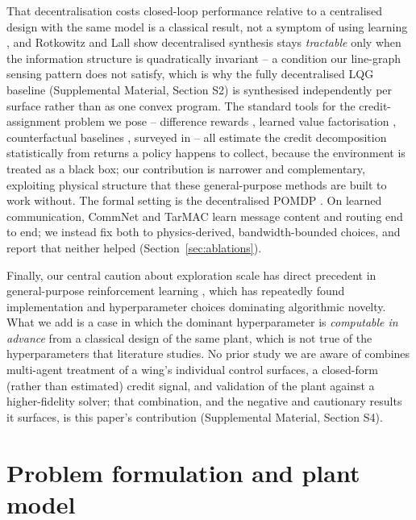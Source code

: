 \documentclass[journal]{new-aiaa}
\begin{document}
That decentralisation costs closed-loop performance relative to a
centralised design with the same model is a classical result, not a
symptom of using learning \cite{siljak1991decentralized,
bakule2008decentralized}, and Rotkowitz and Lall
\cite{rotkowitz2006characterization} show decentralised synthesis stays
\emph{tractable} only when the information structure is quadratically
invariant -- a condition our line-graph sensing pattern does not satisfy,
which is why the fully decentralised LQG baseline (Supplemental Material,
Section S2) is synthesised independently per surface rather than as one
convex program. The standard tools for the credit-assignment problem we
pose -- difference rewards \cite{wolpert2002difference}, learned value
factorisation \cite{sunehag2018vdn,rashid2018qmix}, counterfactual baselines
\cite{foerster2018coma}, surveyed in
\cite{albrecht2023survey,scalingmarl2025,multilevelcredit2025} -- all
estimate the credit decomposition statistically from returns a policy
happens to collect, because the environment is treated as a black box; our
contribution is narrower and complementary, exploiting physical structure
that these general-purpose methods are built to work without. The formal
setting is the decentralised POMDP
\cite{bernstein2002complexity,oliehoek2016concise}. On learned
communication, CommNet \cite{sukhbaatar2016commnet} and TarMAC
\cite{das2019tarmac} learn message content and routing end to end; we
instead fix both to physics-derived, bandwidth-bounded choices, and report
that neither helped (Section~\ref{sec:ablations}).

Finally, our central caution about exploration scale has direct precedent
in general-purpose reinforcement learning
\cite{henderson2018matters,engstrom2020implementation,andrychowicz2021what,
agarwal2021precipice,yu2022mappo}, which has repeatedly found
implementation and hyperparameter choices dominating algorithmic novelty.
What we add is a case in which the dominant hyperparameter is
\emph{computable in advance} from a classical design of the same plant,
which is not true of the hyperparameters that literature studies. No prior
study we are aware of combines multi-agent treatment of a wing's individual
control surfaces, a closed-form (rather than estimated) credit signal, and
validation of the plant against a higher-fidelity solver; that combination,
and the negative and cautionary results it surfaces, is this paper's
contribution (Supplemental Material, Section S4).

\section{Problem formulation and plant model}
\label{sec:problem}
\end{document}
